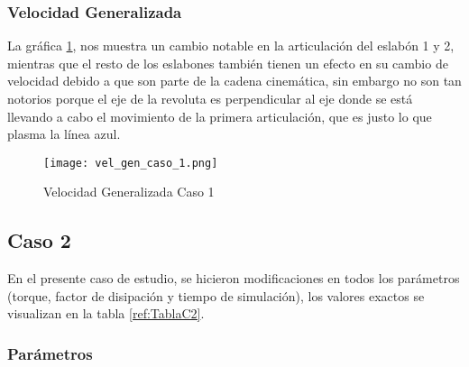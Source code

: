     \subsubsection{Velocidad Generalizada}
    La gráfica \ref{fig:VelGenC1}, nos muestra un cambio notable en la articulación del eslabón 1 y 2, mientras que el resto de los eslabones también tienen un efecto en su cambio de velocidad debido a que son parte de la cadena cinemática, sin embargo no son tan notorios porque el eje de la revoluta es perpendicular al eje donde se está llevando a cabo el movimiento de la primera articulación, que es justo lo que plasma la línea azul.

    \begin{figure}[H]%
            \centering
            \texttt{[image: vel\_gen\_caso\_1.png]} 
        \caption{Velocidad Generalizada Caso 1}
        \label{fig:VelGenC1}
    \end{figure}

\subsection{Caso 2}\label{caso2}
    En el presente caso de estudio, se hicieron modificaciones en todos los parámetros (torque, factor de disipación y tiempo de simulación), los valores exactos se visualizan en la tabla \ref{ref:TablaC2}.
    \subsubsection{Parámetros} 

    \begin{table}[H]%
        \centering
        \begin{center}
        \caption{Parámetros modificados del simulador (Sistema No Conservativo)} 
        \centering
        \bigskip
        \end{center}
        \label{ref:TablaC2}
    \end{table}

